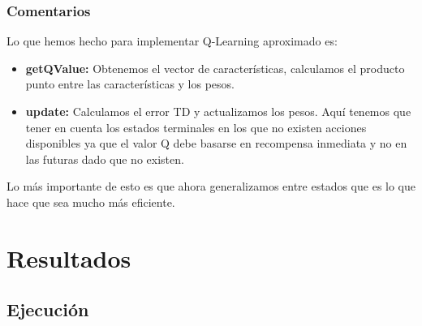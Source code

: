 \documentclass{report}
\begin{document}
      \subsection*{Comentarios}
      Lo que hemos hecho para implementar Q-Learning aproximado es:
        \begin{itemize}
          \item \textbf{getQValue:} Obtenemos el vector de características, calculamos el producto punto entre las características y los pesos.
          \item \textbf{update:} Calculamos el error TD y actualizamos los pesos. Aquí tenemos que tener en cuenta los estados terminales en los que no existen acciones disponibles ya que el valor Q debe basarse en recompensa inmediata y no en las futuras dado que no existen.
        \end{itemize}
      Lo más importante de esto es que ahora generalizamos entre estados que es lo que hace que sea mucho más eficiente.
  \chapter{Resultados} %
    \section{Ejecución} %
\end{document}
